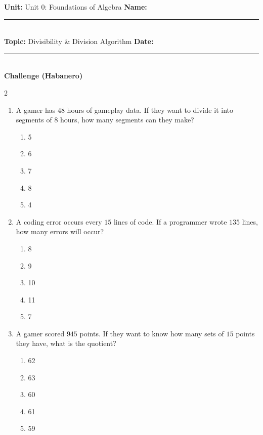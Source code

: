 \documentclass[10pt]{article}
\begin{document}
\enlargethispage{2.5cm}

\begin{tcolorbox}[colback=mainblue!5, colframe=mainblue, sharp corners, boxrule=0.5pt]
    \small \textbf{Unit:} Unit 0: Foundations of Algebra \hfill \textbf{Name:} \rule{3cm}{0.4pt} \\
    \small \textbf{Topic:} Divisibility & Division Algorithm \hfill \textbf{Date:} \rule{2cm}{0.4pt} \\
    \centering \textbf{\large Challenge (Habanero)}
\end{tcolorbox}

\vspace{0.2cm}

\begin{multicols}{2}
\begin{enumerate}[label=\textbf{Q\arabic*.}, leftmargin=*, itemsep=6pt, parsep=0pt]

  \item \small A gamer has $48$ hours of gameplay data. If they want to divide it into segments of $8$ hours, how many segments can they make?
  \begin{enumerate}[label=(\Alph*), leftmargin=0.6cm, nosep, itemsep=2pt]
    \item 5
    \item 6
    \item 7
    \item 8
    \item 4
  \end{enumerate}

  \item \small A coding error occurs every $15$ lines of code. If a programmer wrote $135$ lines, how many errors will occur?
  \begin{enumerate}[label=(\Alph*), leftmargin=0.6cm, nosep, itemsep=2pt]
    \item 8
    \item 9
    \item 10
    \item 11
    \item 7
  \end{enumerate}

  \item \small A gamer scored $945$ points. If they want to know how many sets of $15$ points they have, what is the quotient?
  \begin{enumerate}[label=(\Alph*), leftmargin=0.6cm, nosep, itemsep=2pt]
    \item 62
    \item 63
    \item 60
    \item 61
    \item 59
  \end{enumerate}


\end{enumerate}
\end{multicols}
\end{document}
